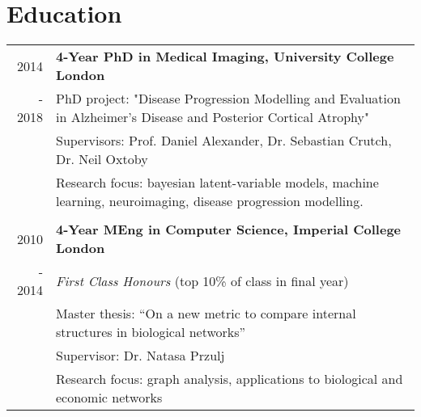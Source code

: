 \documentclass[a4paper,10pt]{article} %
\begin{document}
\section*{Education}

\begin{tabular}{r|p{15.7cm}}
2014 & \large\textbf{4-Year PhD in Medical Imaging, University College London}\\
- 2018 & PhD project: "Disease Progression Modelling and Evaluation in Alzheimer's Disease and Posterior Cortical Atrophy"\\
& \small Supervisors: Prof. Daniel Alexander, Dr. Sebastian Crutch, Dr. Neil Oxtoby\\

& Research focus: bayesian latent-variable models, machine learning, neuroimaging, disease progression modelling.\\

\\
2010 & \large\textbf{4-Year MEng in Computer Science, Imperial College London}\\
- 2014 & \emph{First Class Honours} (top 10\% of class in final year) \\
& Master thesis: ``On a new metric to compare internal structures in biological
networks''\\
& \small Supervisor: Dr. Natasa Przulj\\
& Research focus: graph analysis, applications to biological and economic networks
\end{tabular}
\end{document}
